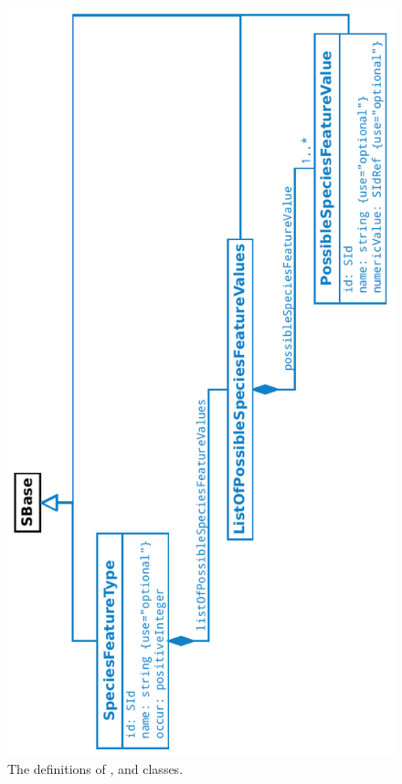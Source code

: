 \begin{figure}[htb]
  \begin{center}
    \includegraphics[angle=-90, scale=0.68]{./figs/multi_003_speciesFeatureType.pdf}
    \caption{The definitions of \SpeciesFeatureType, \ListOfPossibleSpeciesFeatureValues and \PossibleSpeciesFeatureValue classes. }
  \label{fig:SpeciesFeatureType}
  \end{center}
\end{figure}

